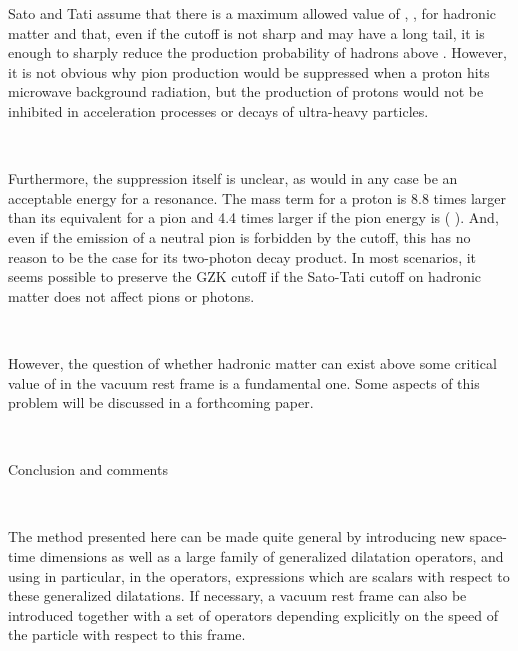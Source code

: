 \documentclass[a4paper,12pt,dvips]{article}
\makeatletter
\renewcommand{\section}{\@startsection{section}{1}{0in}
	{0.4\baselineskip}{0.1\baselineskip}{\Large\bf}}
\makeatother
\begin{document}
Sato and Tati assume that there is a maximum allowed value of \coordHE{} , \coordHE{} , for hadronic matter and that, even if the cutoff is not sharp and may have a long tail, it is enough to sharply reduce the production probability of hadrons above \coordHE{} . However, it is not obvious why \coordHE{} pion production would be suppressed when a \coordHE{} proton hits microwave background radiation, but the production of \coordHE{} protons would not be inhibited in acceleration processes or decays of ultra-heavy particles.

~ 

Furthermore, the suppression itself is unclear, as \coordHE{} would in any case be an acceptable energy for a \myHighlight{$\Delta $}\coordHE{} resonance. The \coordHE{} mass term for a \coordHE{} proton is \myHighlight{$\simeq $}\coordHE{} 8.8 times larger than its equivalent for a \coordHE{} pion  and \myHighlight{$\simeq $}\coordHE{} 4.4 times larger if the pion energy is \coordHE{} (\coordHE{}  \myHighlight{$\simeq $}\coordHE{}  \coordHE{}). And, even if the emission of a neutral pion is forbidden by the \coordHE{} cutoff, this has no reason to be the case for its two-photon decay product. In most scenarios, it seems possible to preserve the GZK cutoff if the Sato-Tati cutoff on hadronic matter does not affect \coordHE{} pions or photons. 

~ 

However, the question of whether hadronic matter can exist above some critical value of \coordHE{} in the vacuum rest frame is a fundamental one. Some aspects of this problem will be discussed in a forthcoming paper. 

~ 
~ 

\section{Conclusion and comments}
\label{concl.sec}

~

The method presented here can be made quite general by introducing new space-time dimensions as well as a large family of generalized dilatation operators, and using in particular, in the \coordHE{} operators, expressions which are scalars with respect to these generalized dilatations. If necessary, a vacuum rest frame can also be introduced together with a set of \coordHE{} operators depending explicitly on the speed of the particle with respect to this frame. 
\end{document}
